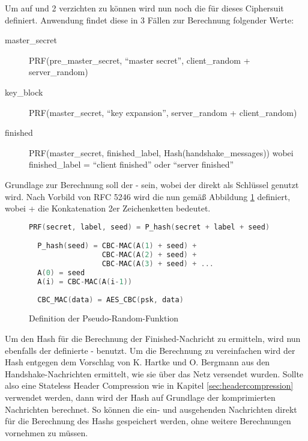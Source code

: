 Um auf  und 2 verzichten zu können wird nun noch die  für dieses Ciphersuit definiert.
Anwendung findet diese in 3 Fällen zur Berechnung folgender Werte:
\begin{description}
  \item[master\_secret] PRF(pre\_master\_secret, "`master secret"', client\_random + server\_random)
  \item[key\_block] PRF(master\_secret, "`key expansion"', server\_random + client\_random)
  \item[finished] PRF(master\_secret, finished\_label, Hash(handshake\_messages)) \newline wobei finished\_label = "`client finished"' oder "`server finished"'
\end{description}
Grundlage zur Berechnung soll der - sein, wobei der  direkt als Schlüssel genutzt wird.
Nach Vorbild von RFC 5246 \cite{rfc5246} wird die  nun gemäß Abbildung \ref{fig:def_psr} definiert, wobei
+ die Konkatenation 2er Zeichenketten bedeutet.
\begin{figure}[ht]
  \centering
  \begin{lstlisting}[language=c]
  PRF(secret, label, seed) = P_hash(secret + label + seed)

  P_hash(seed) = CBC-MAC(A(1) + seed) +
                 CBC-MAC(A(2) + seed) +
                 CBC-MAC(A(3) + seed) + ...
  A(0) = seed
  A(i) = CBC-MAC(A(i-1))
  
  CBC_MAC(data) = AES_CBC(psk, data)
  \end{lstlisting}
  \caption{Definition der Pseudo-Random-Funktion}
  \label{fig:def_psr}
\end{figure}

Um den Hash für die Berechnung der Finished-Nachricht zu ermitteln, wird nun ebenfalls der definierte - benutzt.
Um die Berechnung zu vereinfachen wird der Hash entgegen dem Vorschlag von K. Hartke und O. Bergmann \cite{draftcodtls} aus den
Handshake-Nachrichten ermittelt, wie sie über das Netz versendet wurden. Sollte also eine Stateless Header Compression wie in Kapitel
\ref{sec:headercompression} verwendet werden, dann wird der Hash auf Grundlage der komprimierten Nachrichten berechnet. So können
die ein- und ausgehenden Nachrichten direkt für die Berechnung des Hashs gespeichert werden, ohne weitere Berechnungen vornehmen zu müssen.